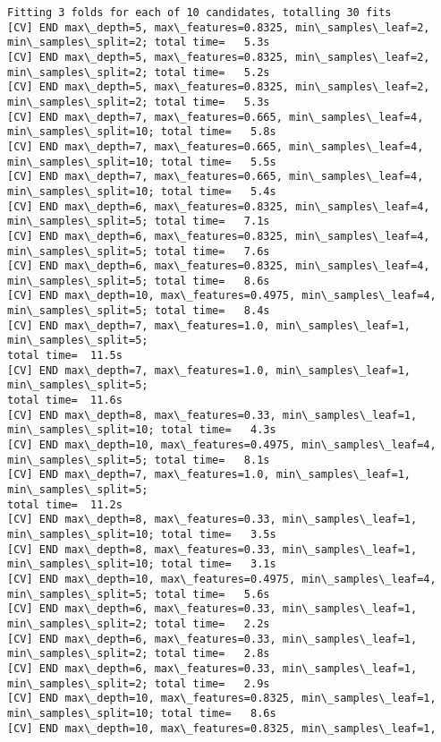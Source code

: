 \documentclass[11pt]{article}
\begin{document}
    \begin{Verbatim}[commandchars=\\\{\}]
Fitting 3 folds for each of 10 candidates, totalling 30 fits
[CV] END max\_depth=5, max\_features=0.8325, min\_samples\_leaf=2,
min\_samples\_split=2; total time=   5.3s
[CV] END max\_depth=5, max\_features=0.8325, min\_samples\_leaf=2,
min\_samples\_split=2; total time=   5.2s
[CV] END max\_depth=5, max\_features=0.8325, min\_samples\_leaf=2,
min\_samples\_split=2; total time=   5.3s
[CV] END max\_depth=7, max\_features=0.665, min\_samples\_leaf=4,
min\_samples\_split=10; total time=   5.8s
[CV] END max\_depth=7, max\_features=0.665, min\_samples\_leaf=4,
min\_samples\_split=10; total time=   5.5s
[CV] END max\_depth=7, max\_features=0.665, min\_samples\_leaf=4,
min\_samples\_split=10; total time=   5.4s
[CV] END max\_depth=6, max\_features=0.8325, min\_samples\_leaf=4,
min\_samples\_split=5; total time=   7.1s
[CV] END max\_depth=6, max\_features=0.8325, min\_samples\_leaf=4,
min\_samples\_split=5; total time=   7.6s
[CV] END max\_depth=6, max\_features=0.8325, min\_samples\_leaf=4,
min\_samples\_split=5; total time=   8.6s
[CV] END max\_depth=10, max\_features=0.4975, min\_samples\_leaf=4,
min\_samples\_split=5; total time=   8.4s
[CV] END max\_depth=7, max\_features=1.0, min\_samples\_leaf=1, min\_samples\_split=5;
total time=  11.5s
[CV] END max\_depth=7, max\_features=1.0, min\_samples\_leaf=1, min\_samples\_split=5;
total time=  11.6s
[CV] END max\_depth=8, max\_features=0.33, min\_samples\_leaf=1,
min\_samples\_split=10; total time=   4.3s
[CV] END max\_depth=10, max\_features=0.4975, min\_samples\_leaf=4,
min\_samples\_split=5; total time=   8.1s
[CV] END max\_depth=7, max\_features=1.0, min\_samples\_leaf=1, min\_samples\_split=5;
total time=  11.2s
[CV] END max\_depth=8, max\_features=0.33, min\_samples\_leaf=1,
min\_samples\_split=10; total time=   3.5s
[CV] END max\_depth=8, max\_features=0.33, min\_samples\_leaf=1,
min\_samples\_split=10; total time=   3.1s
[CV] END max\_depth=10, max\_features=0.4975, min\_samples\_leaf=4,
min\_samples\_split=5; total time=   5.6s
[CV] END max\_depth=6, max\_features=0.33, min\_samples\_leaf=1,
min\_samples\_split=2; total time=   2.2s
[CV] END max\_depth=6, max\_features=0.33, min\_samples\_leaf=1,
min\_samples\_split=2; total time=   2.8s
[CV] END max\_depth=6, max\_features=0.33, min\_samples\_leaf=1,
min\_samples\_split=2; total time=   2.9s
[CV] END max\_depth=10, max\_features=0.8325, min\_samples\_leaf=1,
min\_samples\_split=10; total time=   8.6s
[CV] END max\_depth=10, max\_features=0.8325, min\_samples\_leaf=1,

\end{Verbatim}
\end{document}
